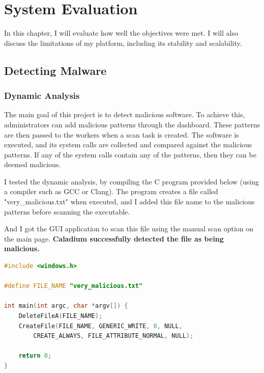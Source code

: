 \chapter{System Evaluation}

In this chapter, I will evaluate how well the objectives were met.
I will also discuss the limitations of my platform,
including its stability and scalability.

\section{Detecting Malware}
\subsection{Dynamic Analysis}
The main goal of this project is to detect malicious software.
To achieve this, administrators can add malicious patterns through the dashboard.
These patterns are then passed to the workers when a scan task is created.
The software is executed, and its system calls are collected
and compared against the malicious patterns.
If any of the system calls contain any of the patterns,
then they can be deemed malicious.

I tested the dynamic analysis, by compiling the C program provided below
(using a compiler such as GCC or Clang).
The program creates a file called "very\_malicious.txt" when executed,
and I added this file name to the malicious patterns
before scanning the executable.

And I got the GUI application to scan this file using
the manual scan option on the main page.
\textbf{Caladium successfully detected the file as being malicious.}

\begin{lstlisting}[language=C]
#include <windows.h>

#define FILE_NAME "very_malicious.txt"

int main(int argc, char *argv[]) {
    DeleteFileA(FILE_NAME);
    CreateFile(FILE_NAME, GENERIC_WRITE, 0, NULL,
        CREATE_ALWAYS, FILE_ATTRIBUTE_NORMAL, NULL);

    return 0;
}
\end{lstlisting}

